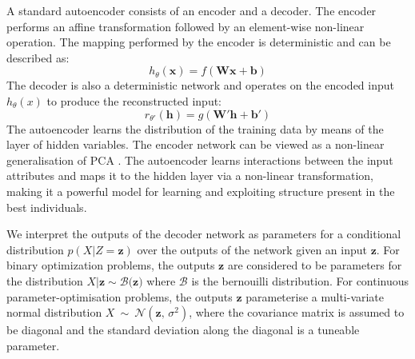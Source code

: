 \documentclass[runningheads,a4paper]{llncs}
\begin{document}



A standard autoencoder consists of an encoder and a decoder. The encoder performs an affine transformation followed by an element-wise non-linear operation. The mapping performed by the encoder is deterministic and can be described as: $$h_{\theta}(\mathbf{x}) = f(\mathbf{Wx + b})$$ The decoder is also a deterministic network and operates on the encoded input $h_{\theta}(x)$ to produce the reconstructed input: $$ r_{\theta'}(\mathbf{h}) = g(\mathbf{W'h + b'})$$ The autoencoder learns the distribution of the training data by means of the layer of hidden variables. The encoder network can be viewed as a non-linear generalisation of PCA \cite{hinton2006reducing}. The autoencoder learns interactions between the input attributes and maps it to the hidden layer via a non-linear transformation, making it a powerful model for learning and exploiting structure present in the best individuals.

We interpret the outputs of the decoder network as parameters for a conditional distribution $p(X|Z=\mathbf{z})$ over the outputs of the network given an input $\mathbf{z}$. For binary optimization problems, the outputs $\mathbf{z}$ are considered to be parameters for the distribution $X|\mathbf{z} \sim \mathcal{B(\mathbf{z}})$ where $\mathcal{B}$ is the bernouilli distribution. For continuous parameter-optimisation problems, the outputs $\mathbf z$ parameterise a multi-variate normal distribution $X\ \sim\ \mathcal{N}(\mathbf{z},\,\sigma^2)$, where the covariance matrix is assumed to be diagonal and the standard deviation along the diagonal is a tuneable parameter.
\end{document}
